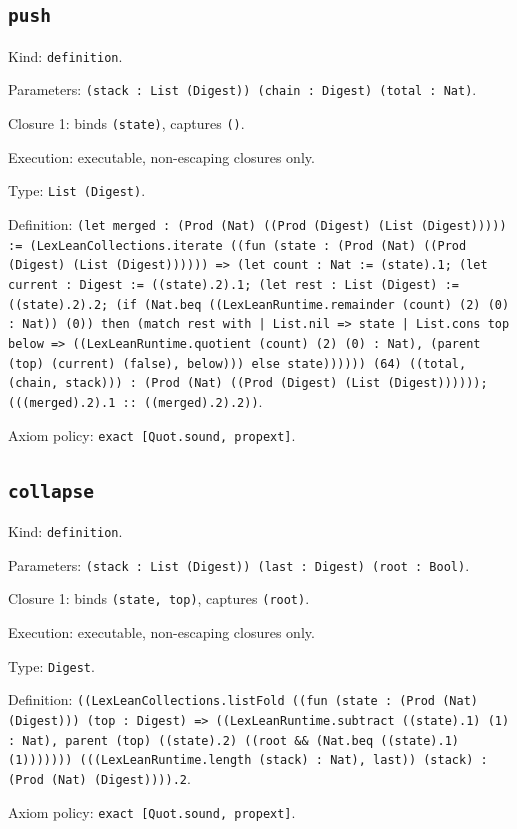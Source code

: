 \documentclass[11pt]{article}
\begin{document}
\subsection*{\texttt{push}}
\noindent Kind: \texttt{definition}.\par
\noindent Parameters: \texttt{(stack : List (Digest)) (chain : Digest) (total : Nat)}.\par
\noindent Closure 1: binds \texttt{(state)}, captures \texttt{()}.\par
\noindent Execution: executable, non-escaping closures only.\par
\noindent Type: \texttt{List (Digest)}.\par
\noindent Definition: \texttt{(let merged : (Prod (Nat) ((Prod (Digest) (List (Digest))))) := (LexLeanCollections.iterate ((fun (state : (Prod (Nat) ((Prod (Digest) (List (Digest)))))) => (let count : Nat := (state).1; (let current : Digest := ((state).2).1; (let rest : List (Digest) := ((state).2).2; (if (Nat.beq ((LexLeanRuntime.remainder (count) (2) (0) : Nat)) (0)) then (match rest with | List.nil => state | List.cons top below => ((LexLeanRuntime.quotient (count) (2) (0) : Nat), (parent (top) (current) (false), below))) else state)))))) (64) ((total, (chain, stack))) : (Prod (Nat) ((Prod (Digest) (List (Digest)))))); (((merged).2).1 :: ((merged).2).2))}.\par
\noindent Axiom policy: \texttt{exact [Quot.sound, propext]}.\par
\subsection*{\texttt{collapse}}
\noindent Kind: \texttt{definition}.\par
\noindent Parameters: \texttt{(stack : List (Digest)) (last : Digest) (root : Bool)}.\par
\noindent Closure 1: binds \texttt{(state, top)}, captures \texttt{(root)}.\par
\noindent Execution: executable, non-escaping closures only.\par
\noindent Type: \texttt{Digest}.\par
\noindent Definition: \texttt{((LexLeanCollections.listFold ((fun (state : (Prod (Nat) (Digest))) (top : Digest) => ((LexLeanRuntime.subtract ((state).1) (1) : Nat), parent (top) ((state).2) ((root \&\& (Nat.beq ((state).1) (1))))))) (((LexLeanRuntime.length (stack) : Nat), last)) (stack) : (Prod (Nat) (Digest)))).2}.\par
\noindent Axiom policy: \texttt{exact [Quot.sound, propext]}.\par
\end{document}
